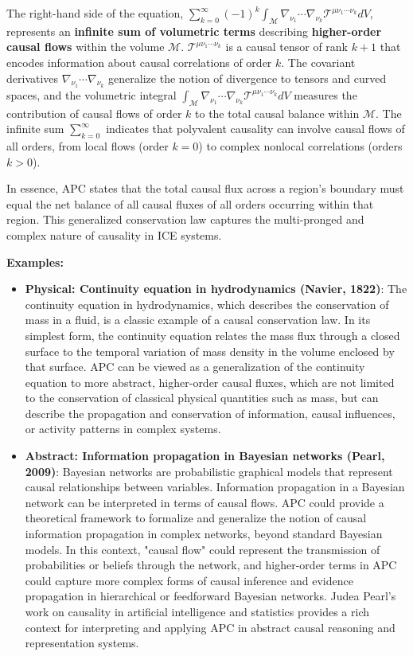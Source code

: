 \documentclass{article}
\begin{document}
The right-hand side of the equation, $\sum_{k=0}^\infty (-1)^k \int_{\mathcal{M}} \nabla_{\nu_1}\cdots\nabla_{\nu_k} \mathcal{T}^{\mu\nu_1\cdots\nu_k} dV$, represents an \textbf{infinite sum of volumetric terms} describing \textbf{higher-order causal flows} within the volume $\mathcal{M}$. $\mathcal{T}^{\mu\nu_1\cdots\nu_k}$ is a causal tensor of rank $k+1$ that encodes information about causal correlations of order $k$. The covariant derivatives $\nabla_{\nu_1}\cdots\nabla_{\nu_k}$ generalize the notion of divergence to tensors and curved spaces, and the volumetric integral $\int_{\mathcal{M}} \nabla_{\nu_1}\cdots\nabla_{\nu_k} \mathcal{T}^{\mu\nu_1\cdots\nu_k} dV$ measures the contribution of causal flows of order $k$ to the total causal balance within $\mathcal{M}$. The infinite sum $\sum_{k=0}^\infty$ indicates that polyvalent causality can involve causal flows of all orders, from local flows (order $k=0$) to complex nonlocal correlations (orders $k>0$).

In essence, APC states that the total causal flux across a region's boundary must equal the net balance of all causal fluxes of all orders occurring within that region. This generalized conservation law captures the multi-pronged and complex nature of causality in ICE systems.


\textbf{Examples:}
\begin{itemize}
\item \textbf{Physical: Continuity equation in hydrodynamics (Navier, 1822)}: The continuity equation in hydrodynamics, which describes the conservation of mass in a fluid, is a classic example of a causal conservation law. In its simplest form, the continuity equation relates the mass flux through a closed surface to the temporal variation of mass density in the volume enclosed by that surface. APC can be viewed as a generalization of the continuity equation to more abstract, higher-order causal fluxes, which are not limited to the conservation of classical physical quantities such as mass, but can describe the propagation and conservation of information, causal influences, or activity patterns in complex systems.

 \item \textbf{Abstract: Information propagation in Bayesian networks (Pearl, 2009)}: Bayesian networks are probabilistic graphical models that represent causal relationships between variables. Information propagation in a Bayesian network can be interpreted in terms of causal flows. APC could provide a theoretical framework to formalize and generalize the notion of causal information propagation in complex networks, beyond standard Bayesian models. In this context, "causal flow" could represent the transmission of probabilities or beliefs through the network, and higher-order terms in APC could capture more complex forms of causal inference and evidence propagation in hierarchical or feedforward Bayesian networks. Judea Pearl's work on causality in artificial intelligence and statistics provides a rich context for interpreting and applying APC in abstract causal reasoning and representation systems.
\end{itemize}
\end{document}
